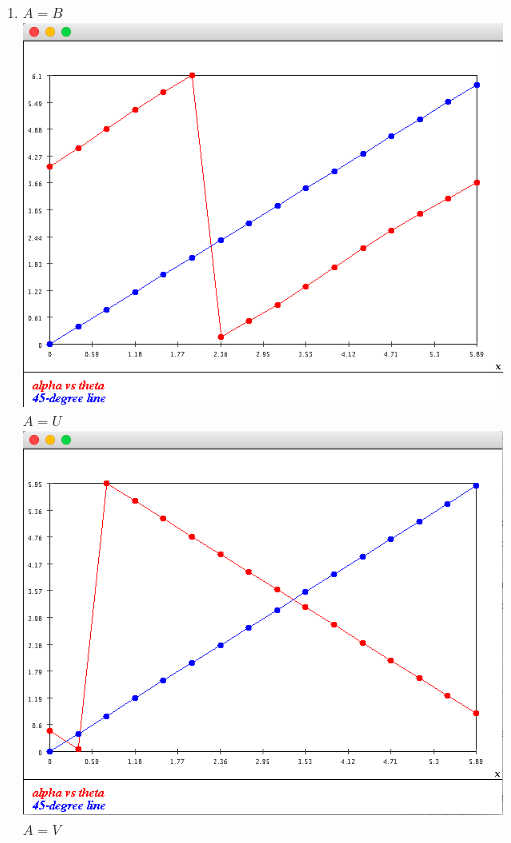 \documentclass{article}
\begin{document}
\begin{enumerate}
\item $A=B$\\
\includegraphics[scale=0.3]{exercise10_original}\\
$A=U$\\
\includegraphics[scale=0.3]{exercise10_u}\\
$A=V$\\

\end{enumerate}
\end{document}
